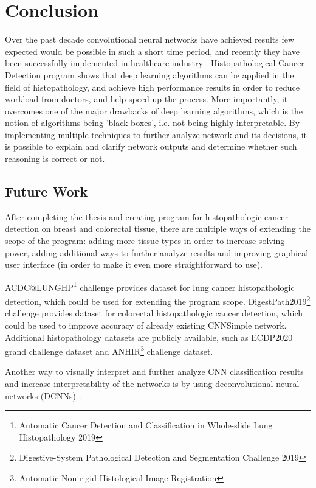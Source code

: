 \chapter{Conclusion}
\label{ch:sum}

Over the past decade convolutional neural networks have achieved results few expected would be possible in such a short time period, and recently they have been successfully implemented in healthcare industry \cite{miotto2018deep}. Histopathological Cancer Detection program shows that deep learning algorithms can be applied in the field of histopathology, and achieve high performance results in order to reduce workload from doctors, and help speed up the process. More importantly, it overcomes one of the major drawbacks of deep learning algorithms, which is the notion of algorithms being 'black-boxes', i.e. not being highly interpretable. By implementing multiple techniques to further analyze network and its decisions, it is possible to explain and clarify network outputs and determine whether such reasoning is correct or not.

\section{Future Work}

After completing the thesis and creating program for histopathologic cancer detection on breast and colorectal tissue, there are multiple ways of extending the scope of the program: adding more tissue types in order to increase solving power, adding additional ways to further analyze results and improving graphical user interface (in order to make it even more straightforward to use).

ACDC@LUNGHP\footnote{Automatic Cancer Detection and Classification in Whole-slide Lung Histopathology 2019} challenge provides dataset for lung cancer histopathologic detection, which could be used for extending the program scope. DigestPath2019\footnote{Digestive-System Pathological Detection and Segmentation Challenge 2019} challenge provides dataset for colorectal histopathologic cancer detection, which could be used to improve accuracy of already existing CNNSimple network. Additional histopathology datasets are publicly available, such as ECDP2020 grand challenge dataset and ANHIR\footnote{ Automatic Non-rigid Histological Image Registration} challenge dataset.

Another way to visually interpret and further analyze CNN classification results and increase interpretability of the networks is by using deconvolutional neural networks (DCNNs) \cite{zeiler2011adaptive}.